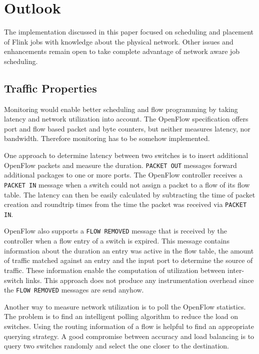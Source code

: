 \section{Outlook}
The implementation discussed in this paper focused on scheduling and placement of Flink jobs with
knowledge about the physical network. Other issues and enhancements remain open to take complete
advantage of network aware job scheduling.

\subsection{Traffic Properties}
Monitoring would enable better scheduling and flow programming by taking latency and network
utilization into account. The OpenFlow specification \cite{openflow} offers port and flow based
packet and byte counters, but neither measures latency, nor bandwidth. Therefore monitoring has to
be somehow implemented.

One approach to determine latency between two switches is to insert additional OpenFlow packets and
measure the duration.  \texttt{PACKET OUT} messages forward additional packages to one or more
ports.  The OpenFlow controller receives a \texttt{PACKET IN} message when a switch could not assign
a packet to a flow of its flow table. The latency can then be easily calculated by subtracting the
time of packet creation and roundtrip times from the time the packet was received via \texttt{PACKET
IN}. \cite{monitoringlatency} \cite{opennetmon}

OpenFlow also supports a \texttt{FLOW REMOVED} message that is received by the controller when a
flow entry of a switch is expired. This message contains information about the duration an entry
was active in the flow table, the amount of traffic matched against an entry and the input port to
determine the source of traffic.  These information enable the computation of utilization between
inter-switch links. This approach does not produce any instrumentation overhead since the
\texttt{FLOW REMOVED} messages are send anyhow. \cite{flowsense}

Another way to measure network utilization is to poll the OpenFlow statistics. The problem is to
find an intelligent polling algorithm to reduce the load on switches. Using the routing information
of a flow is helpful to find an appropriate querying strategy.  A good compromise between accuracy
and load balancing is to query two switches randomly and select the one closer to the destination.
\cite{opentm} \cite{opennetmon}

